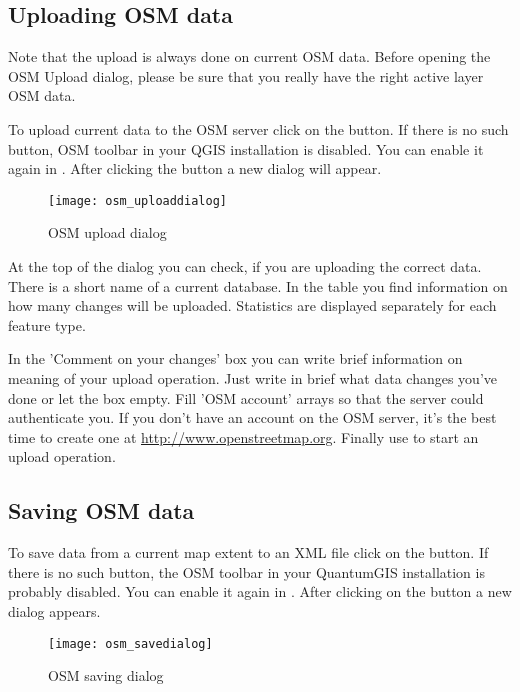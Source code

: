 \subsection{Uploading OSM data}

Note that the upload is always done on current OSM data. Before opening the
OSM Upload dialog, please be sure that you really have the right active
layer ~ OSM data.

To upload current data to the OSM server click on the
 button. If there is no such button,
OSM toolbar in your QGIS installation is disabled. You can enable it
again in  \arrow {} \arrow
{}. After clicking the  button a
new dialog will appear.

\begin{figure}[ht]
   \centering
   \texttt{[image: osm\_uploaddialog]}
   \caption{OSM upload dialog \nixcaption}\label{fig:osmupload}
\end{figure}

At the top of the dialog you can check, if you are uploading the correct data.
There is a short name of a current database. In the table you find information
on how many changes will be uploaded. Statistics are displayed separately
for each feature type.

In the 'Comment on your changes' box you can write brief information on
meaning of your upload operation. Just write in brief what data changes
you've done or let the box empty.
Fill 'OSM account' arrays so that the server could authenticate you. If
you don't have an account on the OSM server, it's the best time to create
one at \url{http://www.openstreetmap.org}. Finally use  to
start an upload operation.

\subsection{Saving OSM data}

To save data from a current map extent to an XML file click on the
 button. If there is no such button,
the OSM toolbar in your QuantumGIS installation is probably disabled. You can
enable it again in  \arrow {} \arrow
{}. After clicking on the button a new dialog appears.

\begin{figure}[ht]
   \centering
   \texttt{[image: osm\_savedialog]}
   \caption{OSM saving dialog \nixcaption}\label{fig:osmsave}
\end{figure}


